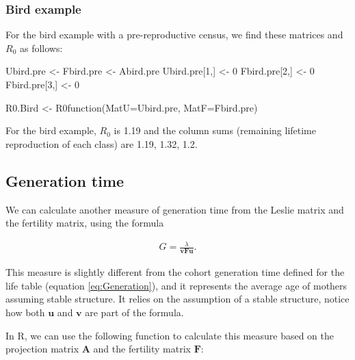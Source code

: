 \documentclass[
]{book}
\newenvironment{Shaded}{\begin{snugshade}}{\end{snugshade}}
\newcommand{\AttributeTok}[1]{\textcolor[rgb]{0.77,0.63,0.00}{#1}}
\newcommand{\DecValTok}[1]{\textcolor[rgb]{0.00,0.00,0.81}{#1}}
\newcommand{\FunctionTok}[1]{\textcolor[rgb]{0.00,0.00,0.00}{#1}}
\newcommand{\NormalTok}[1]{#1}
\newcommand{\OtherTok}[1]{\textcolor[rgb]{0.56,0.35,0.01}{#1}}
\begin{document}
\hypertarget{bird-example-9}{%
\subsubsection*{Bird example}\label{bird-example-9}}

For the bird example with a pre-reproductive census, we find these matrices and \(R_0\) as follows:

\begin{Shaded}
\begin{Highlighting}[]
\NormalTok{Ubird.pre }\OtherTok{\textless{}{-}}\NormalTok{ Fbird.pre }\OtherTok{\textless{}{-}}\NormalTok{ Abird.pre}
\NormalTok{Ubird.pre[}\DecValTok{1}\NormalTok{,] }\OtherTok{\textless{}{-}} \DecValTok{0}
\NormalTok{Fbird.pre[}\DecValTok{2}\NormalTok{,] }\OtherTok{\textless{}{-}} \DecValTok{0}
\NormalTok{Fbird.pre[}\DecValTok{3}\NormalTok{,] }\OtherTok{\textless{}{-}} \DecValTok{0}

\NormalTok{R0.Bird }\OtherTok{\textless{}{-}} \FunctionTok{R0function}\NormalTok{(}\AttributeTok{MatU=}\NormalTok{Ubird.pre, }\AttributeTok{MatF=}\NormalTok{Fbird.pre)}
\end{Highlighting}
\end{Shaded}

For the bird example, \(R_0\) is 1.19 and the column sums (remaining lifetime reproduction of each class) are 1.19, 1.32, 1.2.

\hypertarget{gentime}{%
\subsection{Generation time}\label{gentime}}

We can calculate another measure of generation time from the Leslie matrix and the fertility matrix, using the formula

\begin{align}
G=\frac{\lambda}{\mathbf{v}\mathbf{F}\mathbf{u}}.
\label{eq:GTime}
\end{align}

This measure is slightly different from the cohort generation time defined for the life table (equation \eqref{eq:Generation}), and it represents the average age of mothers assuming stable structure. It relies on the assumption of a stable structure, notice how both \(\mathbf{u}\) and \(\mathbf{v}\) are part of the formula.

In R, we can use the following function to calculate this measure based on the projection matrix \(\mathbf{A}\) and the fertility matrix \(\mathbf{F}\):
\end{document}
